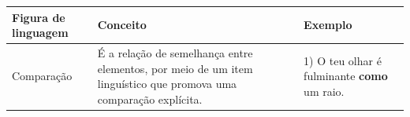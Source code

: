\begin{longtable}[]{@{}lll@{}}
\toprule
\begin{minipage}[b]{0.29\columnwidth}\raggedright
\textbf{Figura de linguagem}\strut
\end{minipage} & \begin{minipage}[b]{0.29\columnwidth}\raggedright
\textbf{Conceito}\strut
\end{minipage} & \begin{minipage}[b]{0.29\columnwidth}\raggedright
\textbf{Exemplo}\strut
\end{minipage}\tabularnewline
\midrule
\endhead
\begin{minipage}[t]{0.29\columnwidth}\raggedright
Comparação\strut
\end{minipage} & \begin{minipage}[t]{0.29\columnwidth}\raggedright
É a relação de semelhança entre elementos, por meio de um item
linguístico que promova uma comparação explícita.\strut
\end{minipage} & \begin{minipage}[t]{0.29\columnwidth}\raggedright
1) O teu olhar é fulminante \textbf{como} um raio.


\end{minipage}
\end{longtable}
